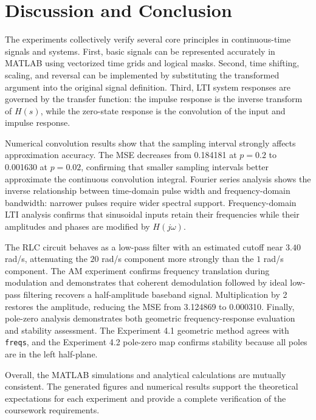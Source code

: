 \documentclass[11pt,a4paper]{article}
\begin{document}
\section{Discussion and Conclusion}
The experiments collectively verify several core principles in continuous-time signals and systems. First, basic signals can be represented accurately in MATLAB using vectorized time grids and logical masks. Second, time shifting, scaling, and reversal can be implemented by substituting the transformed argument into the original signal definition. Third, LTI system responses are governed by the transfer function: the impulse response is the inverse transform of \(H(s)\), while the zero-state response is the convolution of the input and impulse response.

Numerical convolution results show that the sampling interval strongly affects approximation accuracy. The MSE decreases from 0.184181 at \(p=0.2\) to 0.001630 at \(p=0.02\), confirming that smaller sampling intervals better approximate the continuous convolution integral. Fourier series analysis shows the inverse relationship between time-domain pulse width and frequency-domain bandwidth: narrower pulses require wider spectral support. Frequency-domain LTI analysis confirms that sinusoidal inputs retain their frequencies while their amplitudes and phases are modified by \(H(j\omega)\).

The RLC circuit behaves as a low-pass filter with an estimated cutoff near \(3.40\) rad/s, attenuating the \(20\) rad/s component more strongly than the \(1\) rad/s component. The AM experiment confirms frequency translation during modulation and demonstrates that coherent demodulation followed by ideal low-pass filtering recovers a half-amplitude baseband signal. Multiplication by 2 restores the amplitude, reducing the MSE from 3.124869 to 0.000310. Finally, pole-zero analysis demonstrates both geometric frequency-response evaluation and stability assessment. The Experiment 4.1 geometric method agrees with \texttt{freqs}, and the Experiment 4.2 pole-zero map confirms stability because all poles are in the left half-plane.

Overall, the MATLAB simulations and analytical calculations are mutually consistent. The generated figures and numerical results support the theoretical expectations for each experiment and provide a complete verification of the coursework requirements.
\end{document}
